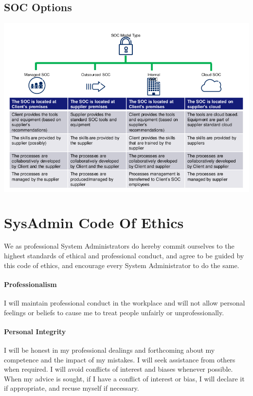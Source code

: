 \documentclass[8pt]{extarticle}
\begin{document}
\begin{multicols}{3}
\subsection{SOC Options}
\begin{center}
    \begin{minipage}{\columnwidth}
        \includegraphics[width=\columnwidth]{soc-options.png}
    \end{minipage}
\end{center}


\section{SysAdmin Code Of Ethics}
We as professional System Administrators do hereby commit ourselves to the highest standards of
ethical and professional conduct, and agree to be guided by this code of ethics, and encourage every
System Administrator to do the same.

\paragraph{Professionalism} I will maintain professional conduct in the workplace and will not allow personal
feelings or beliefs to cause me to treat people unfairly or unprofessionally.
\paragraph{Personal Integrity} I will be honest in my professional dealings and forthcoming about my competence
and the impact of my mistakes. I will seek assistance from others when required.
I will avoid conflicts of interest and biases whenever possible. When my advice is sought, if I have a
conflict of interest or bias, I will declare it if appropriate, and recuse myself if necessary.

\end{multicols}
\end{document}
